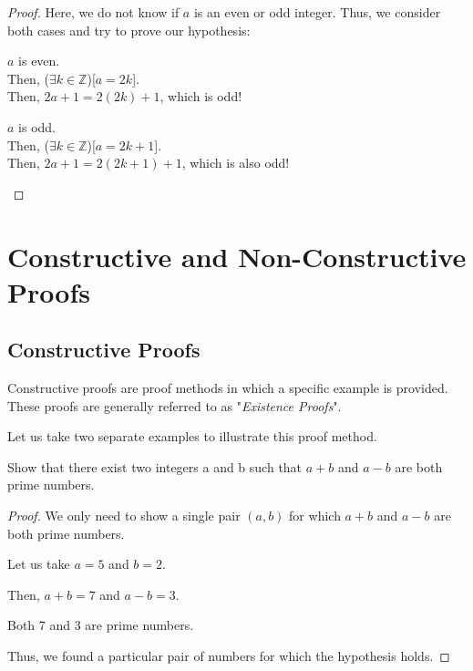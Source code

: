 \begin{proof}
    Here, we do not know if $a$ is an even or odd integer. Thus, we consider
    both cases and try to prove our hypothesis:

    \begin{caselist}
        \item $a$ is even. \\
            Then, ($\exists k \in \mathbb{Z}$)[$a = 2k$]. \\
            Then, $2a + 1 = 2(2k) + 1$, which is odd!
        \item $a$ is odd. \\
            Then, ($\exists k \in \mathbb{Z}$)[$a = 2k + 1$]. \\
            Then, $2a + 1 = 2(2k + 1) + 1$, which is also odd!
    \end{caselist}
\end{proof}

\section{Constructive and Non-Constructive Proofs}
\subsection{Constructive Proofs}
Constructive proofs are proof methods in which a specific example is provided.
These proofs are generally referred to as "\emph{Existence Proofs}".

Let us take two separate examples to illustrate this proof method.

\begin{example}
    Show that there exist two integers a and b such that $a + b$ and $a - b$
    are both prime numbers.
    \begin{proof}
        We only need to show a single pair $(a,b)$ for which $a + b$ and $a - b$
        are both prime numbers.

        Let us take $a = 5$ and $b = 2$.

        Then, $a + b = 7$ and $a - b = 3$.

        Both 7 and 3 are prime numbers.

        Thus, we found a particular pair of numbers for which the hypothesis holds.
    \end{proof}
\end{example}

